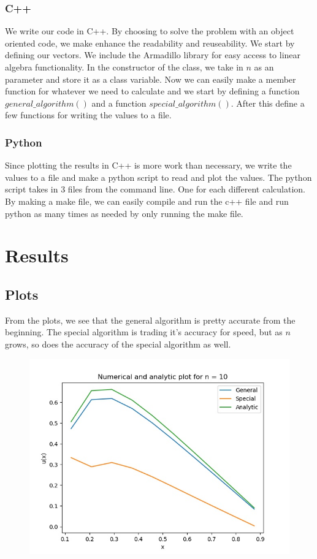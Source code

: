 \documentclass{article}
\begin{document}
\subsubsection{C++}
We write our code in C++. By choosing to solve the problem with an object oriented code, we make enhance the readability and reuseability. We start by defining our vectors. We include the Armadillo library for easy access to linear algebra functionality. In the constructor of the class, we take in $n$ as an parameter and store it as a class variable. Now we can easily make a member function for whatever we need to calculate and we start by defining a function $general\_algorithm()$ and a function $special\_algorithm()$. After this define a few functions for writing the values to a file.

\subsubsection{Python}
Since plotting the results in C++ is more work than necessary, we write the values to a file and make a python script to read and plot the values. The python script takes in 3 files from the command line. One for each different calculation. By making a make file, we can easily compile and run the c++ file and run python as many times as needed by only running the make file.

\newpage
\section{Results}

\subsection{Plots}
From the plots, we see that the general algorithm is pretty accurate from the beginning. The special algorithm is trading it's accuracy for speed, but as $n$ grows, so does the accuracy of the special algorithm as well.

\begin{figure}[H]
    \centering
    \includegraphics[scale=0.6]{Project1/plot_n_10.jpg}
\end{figure}
\end{document}
